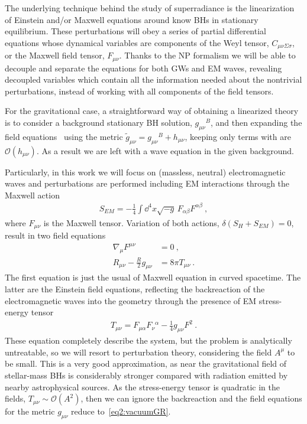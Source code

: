 The underlying technique behind the study of superradiance is the linearization of Einstein and/or Maxwell equations around know BHs in stationary equilibrium.
These perturbations will obey a series of partial differential equations whose dynamical variables are components of the Weyl tensor, $C_{\mu\nu\Sigma\sigma}$, or the Maxwell field tensor, $F_{\mu\nu}$.
Thanks to the NP formalism we will be able to decouple and separate the equations for both GWs and EM waves, revealing decoupled variables which contain all the information needed about the nontrivial perturbations, instead of working with all components of the field tensors.

For the gravitational case, a straightforward way of obtaining a linearized theory is to consider a background stationary BH solution, $g_{\mu\nu}{}^B$, and then expanding the field equations~ using the metric $\tilde{g}_{\mu\nu} = g_{\mu\nu}{}^B + h_{\mu\nu}$, keeping only terms with are $\mathcal{O}(h_{\mu\nu})$. As a result we are left with a wave equation in the given background. 

Particularly, in this work we will focus on (massless, neutral) electromagnetic waves and perturbations are performed including EM interactions through the Maxwell action
\begin{align}
    S_{EM} = - \frac{1}{4} \int \dd^4 x \sqrt{-g} \,F_{\alpha\beta} F^{\alpha\beta} ~,
     \label{eq2:actionEM}
\end{align}
where $F_{\mu\nu}$ is the Maxwell tensor.
Variation of both actions, $\delta(S_H + S_{EM}) = 0$, result in two field equations
\begin{align}
    \nabla_\mu F^{\mu\nu} &= 0 ~, \label{eq2:maxwellEM} \\
    R_{\mu\nu} - \frac{R}{2} g_{\mu\nu} &= 8 \pi T_{\mu\nu} \label{eq2:EM+GR}  ~.
\end{align}
The first equation is just the usual of Maxwell equation in curved spacetime.
The latter are the Einstein field equations, reflecting the backreaction of the electromagnetic waves into the geometry through the presence of EM stress-energy tensor
\begin{align}
    T_{\mu\nu} = F_{\mu\alpha} F_{\nu}{}^{\alpha} - \frac{1}{4} g_{\mu\nu} F^2  ~.
    \label{eq2:stressenergyEM}
\end{align}
These equation completely describe the system, but the problem is analytically untreatable, so we will resort to perturbation theory, considering the field $A^\mu$ to be small. 
This is a very good approximation, as near the gravitational field of stellar-mass BHs is considerably stronger compared with radiation emitted by nearby astrophysical sources.
As the stress-energy tensor is quadratic in the fields, $T_{\mu\nu}\sim\mathcal{O}(A^2)$, then we can ignore the backreaction and the field equations for the metric $g_{\mu\nu}$ reduce to~\eqref{eq2:vacuumGR}.


